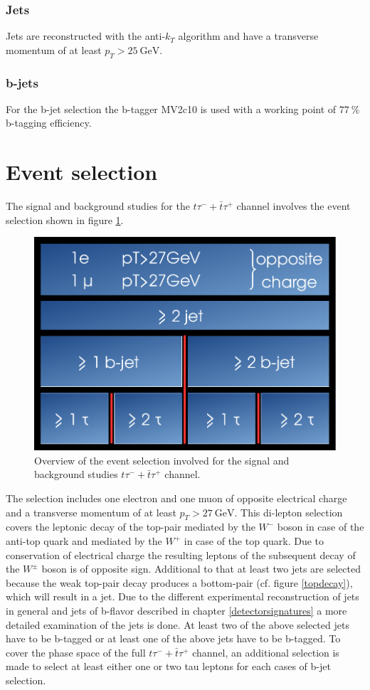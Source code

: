 \subsubsection*{Jets}
Jets are reconstructed with the anti-$k_T$ algorithm and have a transverse momentum of at least $p_T>\SI{25}{\giga\electronvolt}$. 
\subsubsection*{b-jets}
For the b-jet selection the b-tagger MV2c10 is used with a working point of $\SI{77}{\percent}$ b-tagging efficiency.
\section{Event selection}\label{eventselection}
The signal and background studies for the $t\tau^{-}+\bar{t}\tau^{+}$ channel involves the event selection shown in figure \ref{selection}.\newline
%
\begin{figure}[htbp]                                 
 \begin{center}                                       
  \includegraphics[width=0.45\linewidth]{figures/selection.pdf} 
   \caption[Overview of the event selection.]{Overview of the event selection involved for the signal and background studies $t\tau^{-}+\bar{t}\tau^{+}$ channel.}
  \label{selection}                                    
 \end{center}
\end{figure}
%
The selection includes one electron and one muon of opposite electrical charge and a transverse momentum of at least $p_T>\SI{27}{\giga\electronvolt}$. This di-lepton selection covers the leptonic decay of the top-pair mediated by the $W^-$ boson in case of the anti-top quark and mediated by the $W^+$ in case of the top quark. Due to conservation of electrical charge the resulting leptons of the subsequent decay of the $W^\pm$ boson is of opposite sign. Additional to that at least two jets are selected because the weak top-pair decay produces a bottom-pair (cf. figure \ref{topdecay}), which will result in a jet. Due to the different experimental reconstruction of jets in general and jets of b-flavor described in chapter \ref{detectorsignatures} a more detailed examination of the jets is done. At least two of the above selected jets have to be b-tagged or at least one of the above jets have to be b-tagged. To cover the phase space of the full $t\tau^{-}+\bar{t}\tau^{+}$ channel, an additional selection is made to select at least either one or two tau leptons for each cases of b-jet selection.    
